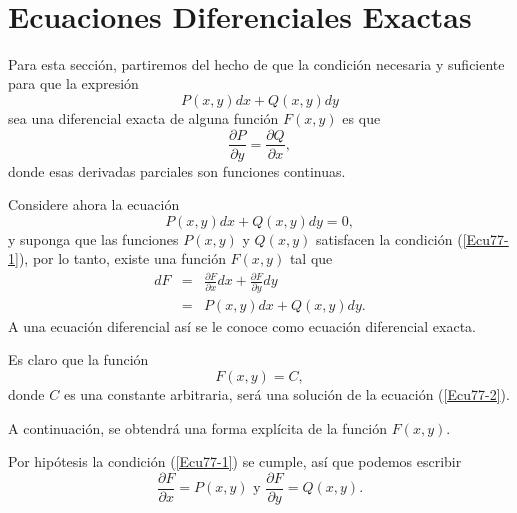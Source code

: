 \documentclass[12pt]{article}
\begin{document}
\ \\
%
%
\section{Ecuaciones Diferenciales Exactas}
Para esta secci\'{o}n, partiremos del hecho de que la condici\'{o}n necesaria y 
suf\/iciente para que la expresi\'{o}n
\begin{equation}
P(x,y)dx+Q(x,y)dy 
\end{equation}
sea una diferencial exacta de alguna funci\'{o}n $F(x,y)$ es que
\begin{equation}
\frac{\partial P}{\partial y}=\frac{\partial Q}
{\partial x},
\label{Ecu77-1}
\end{equation}
donde esas derivadas parciales son funciones continuas.

%
Considere ahora la 
ecuaci\'{o}n %
\begin{equation}
P(x,y)dx+Q(x,y)dy=0,
\label{Ecu77-2}
\end{equation}
y suponga que las funciones 
$P(x,y)$ y $Q(x,y)$ satisfacen la condici\'{o}n 
(\ref{Ecu77-1}), por lo tanto, existe una funci\'{o}n 
$F(x,y)$ tal que
\begin{eqnarray}
dF&=&\frac{\partial F}{\partial x}dx+
\frac{\partial F}{\partial y}dy\\
&=&P(x,y)dx+Q(x,y)dy.
\end{eqnarray}
A una ecuaci\'{o}n diferencial as\'{i} se le conoce como ecuaci\'{o}n diferencial exacta.


Es claro que la funci\'{o}n 
\begin{equation}
 F(x,y)=C,
\end{equation}
donde $C$ es una constante arbitraria, ser\'{a} una soluci\'{o}n de la ecuaci\'{o}n (\ref{Ecu77-2}). 


\newpage
A continuaci\'{o}n, se obtendr\'{a} una forma expl\'{i}cita de la funci\'{o}n $F(x,y)$.


Por hip\'{o}tesis la condici\'{o}n (\ref{Ecu77-1}) se cumple, as\'{i} que podemos escribir
\begin{equation}
 \frac{\partial F}
 {\partial x}= P(x,y)
\mbox{\ \ \ y\ \ \ }
\frac{\partial F}{\partial y}=Q(x,y).
\label{Ecu77-3}
\end{equation}
\end{document}
